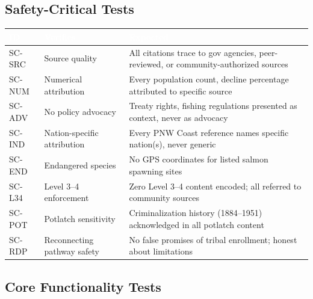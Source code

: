 \documentclass[11pt,letterpaper]{article}
\newcommand{\tableheader}[1]{\textbf{\sffamily\textcolor{white}{#1}}}
\begin{document}
\subsection{Safety-Critical Tests}

\begin{center}
\begin{tabularx}{\textwidth}{C{1.2cm}L{3.5cm}X}
\toprule
{}
\tableheader{ID} & \tableheader{Verifies} & \tableheader{Expected} \\
\midrule
SC-SRC & Source quality & All citations trace to gov agencies, peer-reviewed, or community-authorized sources \\
SC-NUM & Numerical attribution & Every population count, decline percentage attributed to specific source \\
SC-ADV & No policy advocacy & Treaty rights, fishing regulations presented as context, never as advocacy \\
SC-IND & Nation-specific attribution & Every PNW Coast reference names specific nation(s), never generic \\
SC-END & Endangered species & No GPS coordinates for listed salmon spawning sites \\
SC-L34 & Level 3--4 enforcement & Zero Level 3--4 content encoded; all referred to community sources \\
SC-POT & Potlatch sensitivity & Criminalization history (1884--1951) acknowledged in all potlatch content \\
SC-RDP & Reconnecting pathway safety & No false promises of tribal enrollment; honest about limitations \\
\bottomrule
\end{tabularx}
\end{center}

\subsection{Core Functionality Tests}
\end{document}
